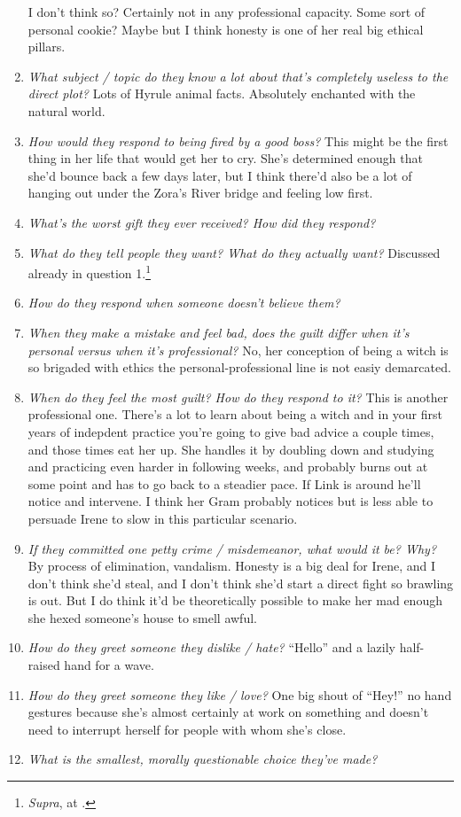 \begin{enumerate}
      I don't think so? Certainly not in any professional capacity. Some sort of personal cookie? Maybe but I think honesty is one of her real big ethical pillars.
    \item \textit{What subject / topic do they know a lot about that’s completely useless to the direct plot?}
      Lots of Hyrule animal facts. Absolutely enchanted with the natural world. 
    \item \textit{How would they respond to being fired by a good boss?}
      This might be the first thing in her life that would get her to cry. She's determined enough that she'd bounce back a few days later, but I think there'd also be a lot of hanging out under the Zora's River bridge and feeling low first.
    \item \textit{What’s the worst gift they ever received? How did they respond?}
    \item \textit{What do they tell people they want? What do they actually want?}
      Discussed already in question 1.\footnote{\textit{Supra}, at \pageref{irene:characterqs:lies}.}
    \item \textit{How do they respond when someone doesn’t believe them?}

    \item \textit{When they make a mistake and feel bad, does the guilt differ when it’s personal versus when it’s professional?}
      No, her conception of being a witch is so brigaded with ethics the personal-professional line is not easiy demarcated.
    \item \textit{When do they feel the most guilt? How do they respond to it?}
      This is another professional one. There's a lot to learn about being a witch and in your first years of indepdent practice you're going to give bad advice a couple times, and those times eat her up. She handles it by doubling down and studying and practicing even harder in following weeks, and probably burns out at some point and has to go back to a steadier pace. If Link is around he'll notice and intervene. I think her Gram probably notices but is less able to persuade Irene to slow in this particular scenario.
    \item \textit{If they committed one petty crime / misdemeanor, what would it be? Why?}
      By process of elimination, vandalism. Honesty is a big deal for Irene, and I don't think she'd steal, and I don't think she'd start a direct fight so brawling is out. But I do think it'd be theoretically possible to make her mad enough she hexed someone's house to smell awful. 
    \item \textit{How do they greet someone they dislike / hate?}
      ``Hello'' and a lazily half-raised hand for a wave.
    \item \textit{How do they greet someone they like / love?}
      One big shout of ``Hey!'' no hand gestures because she's almost certainly at work on something and doesn't need to interrupt herself for people with whom she's close.
    \item \textit{What is the smallest, morally questionable choice they’ve made?}


\end{enumerate}
